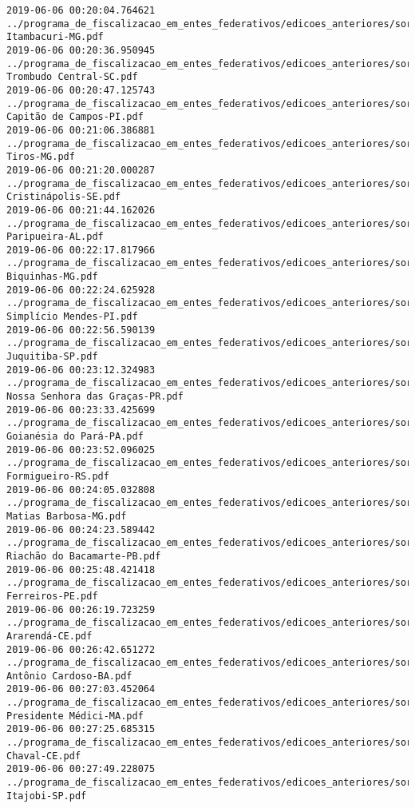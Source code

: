 \begin{lstlisting}
2019-06-06 00:20:04.764621 ../programa_de_fiscalizacao_em_entes_federativos/edicoes_anteriores/sorteio_40/3366-Itambacuri-MG.pdf
2019-06-06 00:20:36.950945 ../programa_de_fiscalizacao_em_entes_federativos/edicoes_anteriores/sorteio_40/3436-Trombudo Central-SC.pdf
2019-06-06 00:20:47.125743 ../programa_de_fiscalizacao_em_entes_federativos/edicoes_anteriores/sorteio_40/3425-Capitão de Campos-PI.pdf
2019-06-06 00:21:06.386881 ../programa_de_fiscalizacao_em_entes_federativos/edicoes_anteriores/sorteio_40/3358-Tiros-MG.pdf
2019-06-06 00:21:20.000287 ../programa_de_fiscalizacao_em_entes_federativos/edicoes_anteriores/sorteio_40/3380-Cristinápolis-SE.pdf
2019-06-06 00:21:44.162026 ../programa_de_fiscalizacao_em_entes_federativos/edicoes_anteriores/sorteio_40/3388-Paripueira-AL.pdf
2019-06-06 00:22:17.817966 ../programa_de_fiscalizacao_em_entes_federativos/edicoes_anteriores/sorteio_40/3362-Biquinhas-MG.pdf
2019-06-06 00:22:24.625928 ../programa_de_fiscalizacao_em_entes_federativos/edicoes_anteriores/sorteio_40/3427-Simplício Mendes-PI.pdf
2019-06-06 00:22:56.590139 ../programa_de_fiscalizacao_em_entes_federativos/edicoes_anteriores/sorteio_40/3354-Juquitiba-SP.pdf
2019-06-06 00:23:12.324983 ../programa_de_fiscalizacao_em_entes_federativos/edicoes_anteriores/sorteio_40/3322-Nossa Senhora das Graças-PR.pdf
2019-06-06 00:23:33.425699 ../programa_de_fiscalizacao_em_entes_federativos/edicoes_anteriores/sorteio_40/3390-Goianésia do Pará-PA.pdf
2019-06-06 00:23:52.096025 ../programa_de_fiscalizacao_em_entes_federativos/edicoes_anteriores/sorteio_40/3336-Formigueiro-RS.pdf
2019-06-06 00:24:05.032808 ../programa_de_fiscalizacao_em_entes_federativos/edicoes_anteriores/sorteio_40/3370-Matias Barbosa-MG.pdf
2019-06-06 00:24:23.589442 ../programa_de_fiscalizacao_em_entes_federativos/edicoes_anteriores/sorteio_40/3423-Riachão do Bacamarte-PB.pdf
2019-06-06 00:25:48.421418 ../programa_de_fiscalizacao_em_entes_federativos/edicoes_anteriores/sorteio_40/3413-Ferreiros-PE.pdf
2019-06-06 00:26:19.723259 ../programa_de_fiscalizacao_em_entes_federativos/edicoes_anteriores/sorteio_40/3409-Ararendá-CE.pdf
2019-06-06 00:26:42.651272 ../programa_de_fiscalizacao_em_entes_federativos/edicoes_anteriores/sorteio_40/3326-Antônio Cardoso-BA.pdf
2019-06-06 00:27:03.452064 ../programa_de_fiscalizacao_em_entes_federativos/edicoes_anteriores/sorteio_40/3417-Presidente Médici-MA.pdf
2019-06-06 00:27:25.685315 ../programa_de_fiscalizacao_em_entes_federativos/edicoes_anteriores/sorteio_40/3405-Chaval-CE.pdf
2019-06-06 00:27:49.228075 ../programa_de_fiscalizacao_em_entes_federativos/edicoes_anteriores/sorteio_40/3356-Itajobi-SP.pdf

\end{lstlisting}
